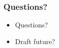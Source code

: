 \documentclass[11pt,show 
notes,notheorems,noamsthm,blank]{beamer} %
\begin{document}
\begin{frame}
 \frametitle{Questions?}
 
 \begin{itemize}
  \item Questions?
  \item Draft future?
 \end{itemize}

 
 
\end{frame}


% 
% 
% 
%  
\end{document}
